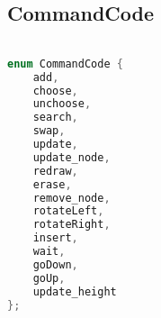 \subsection{CommandCode}
\begin{lstlisting}[language=C++]

enum CommandCode {
    add,
    choose,
    unchoose,
    search,
    swap,
    update,
    update_node,
    redraw,
    erase,
    remove_node,
    rotateLeft,
    rotateRight,
    insert,
    wait,
    goDown,
    goUp,
    update_height
};






\end{lstlisting}
